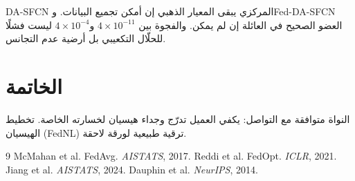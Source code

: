 ﻿\documentclass[12pt,a4paper]{article}
\begin{document}
\textenglish{DA-SFCN} المركزي يبقى المعيار الذهبي إن أمكن تجميع البيانات.
و\textenglish{Fed-DA-SFCN} العضو الصحيح في العائلة إن لم يمكن. والفجوة بين
$4\times 10^{-11}$ و$4\times 10^{-4}$ ليست فشلًا للحلّال التكعيبي بل أرضية
عدم التجانس.

\section{الخاتمة}
النواة متوافقة مع التواصل: يكفي العميل تدرّج وجداء هيسيان لخسارته الخاصة.
تخطيط الهيسيان (\textenglish{FedNL}) ترقية طبيعية لورقة لاحقة.

\begin{english}
\begin{thebibliography}{9}
 McMahan et al. FedAvg. \textit{AISTATS}, 2017.
 Reddi et al. FedOpt. \textit{ICLR}, 2021.
 Jiang et al. \textit{AISTATS}, 2024.
 Dauphin et al. \textit{NeurIPS}, 2014.
\end{thebibliography}
\end{english}
\end{document}
